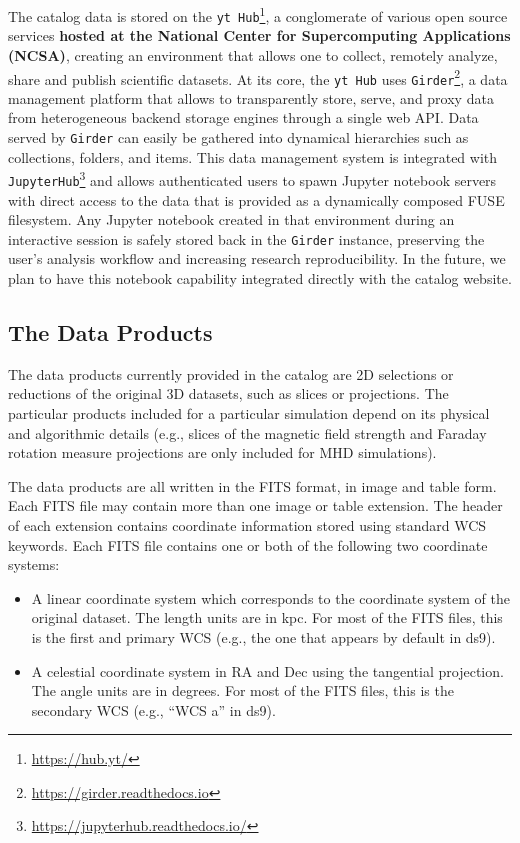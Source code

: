 \documentclass{emulateapj}
\newcommand{\code}[1]{\texttt{#1}}
\begin{document}
The catalog data is stored on the \code{yt Hub}\footnote{\url{https://hub.yt/}}, a conglomerate of various open source
services \textbf{hosted at the National Center for Supercomputing Applications (NCSA)}, creating an environment that allows one to collect, remotely analyze, share and publish scientific datasets. At its core, the \code{yt Hub} uses \code{Girder}\footnote{\url{https://girder.readthedocs.io}}, a data management platform that allows to transparently store, serve, and proxy data from heterogeneous backend storage engines through a single
web API. Data served by \code{Girder} can easily be gathered into dynamical hierarchies such as collections, folders, and
items. This data management system is integrated with \code{JupyterHub}\footnote{\url{https://jupyterhub.readthedocs.io/}} and allows authenticated users to spawn Jupyter notebook servers with direct access to the data that is provided as a dynamically composed FUSE filesystem. Any Jupyter
notebook created in that environment during an interactive session is safely stored back in the \code{Girder} instance,
preserving the user's analysis workflow and increasing research reproducibility. In the future, we plan to have this
notebook capability integrated directly with the catalog website.

\subsection{The Data Products}\label{sec:data}

The data products currently provided in the catalog are 2D selections or reductions of the original 3D datasets, such as slices or projections. The particular products included for a particular simulation depend on its physical and algorithmic details (e.g., slices of the magnetic field strength and Faraday rotation measure projections are only included for MHD simulations).

The data products are all written in the FITS format, in image and table form. Each FITS file may contain more than one image or table extension. The header of each extension contains coordinate information stored using standard WCS keywords. Each FITS file contains one or both of the following two coordinate systems:

\begin{itemize}
\item A linear coordinate system which corresponds to the coordinate system of the original dataset. The length units are in kpc. For most of the FITS files, this is the first and primary WCS (e.g., the one that appears by default in ds9).
\item A celestial coordinate system in RA and Dec using the tangential projection. The angle units are in degrees. For most of the FITS files, this is the secondary WCS (e.g., ``WCS a'' in ds9).
\end{itemize}
\end{document}

